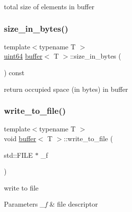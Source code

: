 total size of elements in buffer 

\mbox{\label{structbuffer_a2b74a935bb50716bba0835781545803d}} 
\subsubsection{\texorpdfstring{size\+\_\+in\+\_\+bytes()}{size\_in\_bytes()}\hspace{0.1cm}{\footnotesize\ttfamily [2/2]}}
{\footnotesize\ttfamily template$<$typename T $>$ \\
\hyperlink{types_8h_a60e8696a4678cd348e991a1f172e53f7}{uint64} \hyperlink{structbuffer}{buffer}$<$ T $>$\+::size\+\_\+in\+\_\+bytes (\begin{DoxyParamCaption}{ }\end{DoxyParamCaption}) const\hspace{0.3cm}{\ttfamily [inline]}}



return occupied space (in bytes) in buffer 

\mbox{\label{structbuffer_ac31d1516df0036a19bb3e58a4a2fac8a}} 
\subsubsection{\texorpdfstring{write\+\_\+to\+\_\+file()}{write\_to\_file()}}
{\footnotesize\ttfamily template$<$typename T $>$ \\
void \hyperlink{structbuffer}{buffer}$<$ T $>$\+::write\+\_\+to\+\_\+file (\begin{DoxyParamCaption}\item[{std\+::\+F\+I\+LE $\ast$}]{\+\_\+f }\end{DoxyParamCaption})\hspace{0.3cm}{\ttfamily [inline]}}



write to file 


\begin{DoxyParams}{Parameters}
{\em \+\_\+f} & file descriptor \\
\hline
\end{DoxyParams}


